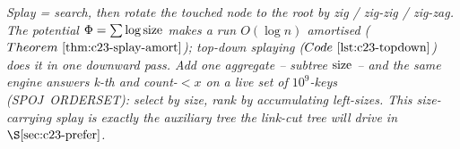 \begin{recallbox}
\emph{Splay = search, then rotate the touched node to the root by zig / zig-zig /
zig-zag. The potential \(\Phi=\sum\log\operatorname{size}\) makes a run \(O(\log n)\) amortised
(\(\thmref{c23-splay-amort}\)); top-down splaying (\(\coderef{c23-topdown}\)) does it in
one downward pass. Add one aggregate -- subtree \(\operatorname{size}\) -- and the same engine
answers k-th and count-\(<x\) on a live set of \(10^9\)-keys (SPOJ~ORDERSET): select
by size, rank by accumulating left-sizes. This size-carrying splay is exactly the
auxiliary tree the link-cut tree will drive in \(\secref{c23-prefer}\).}
\end{recallbox}
